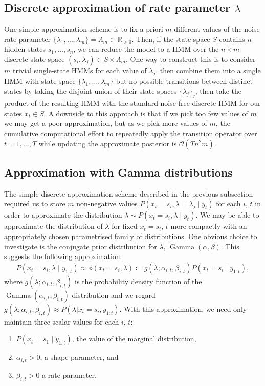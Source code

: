 \documentclass[twoside, 11pt]{article}
\DeclareMathOperator*{\gammad}{Gamma}
\newcommand{\reals}[0] {\mathbb{R}}
\newcommand{\bigO}[0] {\mathcal{O}}
\begin{document}
\subsection{Discrete approximation of rate parameter $\lambda$}

One simple approximation scheme is to fix a-priori $m$ different values of the noise rate parameter $\{ \lambda_1, \ldots, \lambda_m \} = \Lambda_m \subset \reals_{>0}$. Then, if the state space $S$ contains $n$ hidden states $s_1, \ldots, s_n$, we can reduce the model to a HMM over the $n \times m$ discrete state space $(s_i , \lambda_j ) \in S \times \Lambda_m$. One way to construct this is to consider $m$ trivial single-state HMMs for each value of $\lambda_j$, then combine them into a single HMM with state space $\{ \lambda_1, \ldots, \lambda_m \}$ but no possible transitions between distinct states by taking the disjoint union of their state spaces $\{ \lambda_j \}_j$, then take the product of the resulting HMM with the standard noise-free discrete HMM for our states $x_t \in S$.  A downside to this approach is that if we pick too few values of $m$ we may get a poor approximation, but as we pick more values of $m$, the cumulative computational effort to repeatedly apply the transition operator over $t = 1, \ldots, T$ while updating the approximate posterior is $ \bigO (T n^2 m ) $.

\subsection{Approximation with Gamma distributions}

The simple discrete approximation scheme described in the previous subsection required us to store $m$ non-negative values $P(x_t=s_i, \lambda=\lambda_j \mid y_t)$ for each $i$, $t$ in order to approximate the distribution $\lambda \sim P(x_t=s_i, \lambda \mid y_t)$. We may be able to approximate the distribution of $\lambda$ for fixed $x_t=s_i$, $t$ more compactly with an appropriately chosen parametrised family of distributions. One obvious choice to investigate is the conjugate prior distribution for $\lambda$, $\gammad(\alpha, \beta)$. This suggests the following approximation:
\begin{equation}
P\left(x_t=s_i, \lambda \mid y_{1:t} \right) \approx \phi(x_t=s_i, \lambda) \coloneqq g(\lambda ; \alpha_{i,t}, \beta_{i,t}) P(x_t=s_i \mid y_{1:t} ) ,
\end{equation}
where $g(\lambda ; \alpha_{i,t}, \beta_{i,t})$ is the probability density function of the $\gammad(\alpha_{i, t}, \beta_{i, t})$ distribution and we regard $g(\lambda ; \alpha_{i,t}, \beta_{i,t}) \approx P(\lambda | x_t=s_i, y_{1:t})$. With this approximation, we need only maintain three scalar values for each $i$, $t$:
\begin{enumerate}
\item $P(x_t=s_1 \mid y_{1:t})$, the value of the marginal distribution,
\item $\alpha_{i,t}>0$, a shape parameter, and
\item $\beta_{i,t}>0$ a rate parameter.
\end{enumerate}
\end{document}

